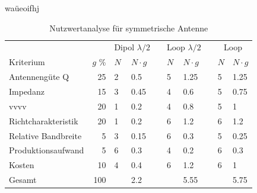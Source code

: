 waüeoifhj
\newpage
\begin{table}[!ht]
  \centering
  \begin{tabular}{l r l l l l l l l l} \toprule 
  && \multicolumn{2}{c}{Dipol $\lambda/2$}   && \multicolumn{2}{c}{Loop $\lambda/2$}   && \multicolumn{2}{c}{Loop} \\ \cmidrule{3-4} \cmidrule{6-7} \cmidrule{9-10}
  Kriterium                 & $g$ \%  		& $N$ & $N\cdot g$          && $N$ & $N\cdot g$             		&& $N$ & $N\cdot g$ \\ \midrule
  Antennengüte Q            	&  25             & 2   & 0.5               && 5   & 1.25                        && 5   & 1.25 \\
  Impedanz                  	&  15             & 3   & 0.45              && 4   & 0.6                         && 5   & 0.75 \\
  vvvv    					&  20             & 1   & 0.2               && 4   & 0.8                         && 5   & 1 \\
  Richtcharakteristik       	&  20             & 1   & 0.2               && 6   & 1.2                         && 6   & 1.2 \\
  Relative Bandbreite       	&   5             & 3   & 0.15              && 6   & 0.3                         && 5   & 0.25 \\
  Produktionsaufwand           	&   5             & 6   & 0.3               && 4   & 0.2                         && 6   & 0.3 \\
  Kosten                    	&  10             & 4   & 0.4               && 6   & 1.2                         && 6   & 1 \\
  Gesamt                    	& 100             &     & 2.2               &&     & 5.55                        &&     & 5.75 \\ \bottomrule
  \end{tabular}
  \caption{Nutzwertanalyse für symmetrische Antenne}
  \label{nutzwertEvaluation}
\end{table}

\newpage
